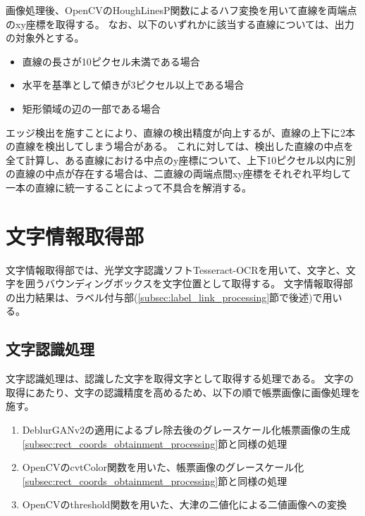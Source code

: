 画像処理後、OpenCVのHoughLinesP関数によるハフ変換を用いて直線を両端点のxy座標を取得する。
なお、以下のいずれかに該当する直線については、出力の対象外とする。

\begin{itemize}
    \item 直線の長さが10ピクセル未満である場合
    \item 水平を基準として傾きが3ピクセル以上である場合
    \item 矩形領域の辺の一部である場合
\end{itemize}

エッジ検出を施すことにより、直線の検出精度が向上するが、直線の上下に2本の直線を検出してしまう場合がある。
これに対しては、検出した直線の中点を全て計算し、ある直線における中点のy座標について、上下10ピクセル以内に別の直線の中点が存在する場合は、二直線の両端点間xy座標をそれぞれ平均して一本の直線に統一することによって不具合を解消する。




\section{文字情報取得部}\label{sec:OCR_part}
文字情報取得部では、光学文字認識ソフトTesseract-OCRを用いて、文字と、文字を囲うバウンディングボックスを文字位置として取得する。
文字情報取得部の出力結果は、ラベル付与部(\ref{subsec:label_link_processing}節で後述)で用いる。

\subsection{文字認識処理}\label{subsec:char_recognition_processing}
文字認識処理は、認識した文字を取得文字として取得する処理である。
文字の取得にあたり、文字の認識精度を高めるため、以下の順で帳票画像に画像処理を施す。

\begin{enumerate}
    \item DeblurGANv2の適用によるブレ除去後のグレースケール化帳票画像の生成\\
        \ref{subsec:rect_coords_obtainment_processing}節と同様の処理
    \item OpenCVのcvtColor関数を用いた、帳票画像のグレースケール化\\
        \ref{subsec:rect_coords_obtainment_processing}節と同様の処理
    \item OpenCVのthreshold関数を用いた、大津の二値化による二値画像への変換\\
\end{enumerate}

